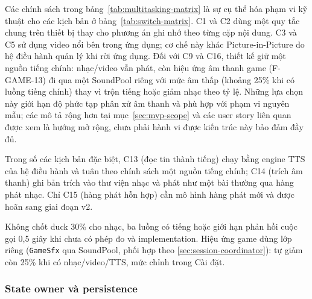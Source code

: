 Các chính sách trong bảng~\ref{tab:multitasking-matrix} là sự cụ thể hóa phạm vi kỹ thuật cho các kịch bản ở bảng~\ref{tab:switch-matrix}. C1 và C2 dùng một quy tắc chung trên thiết bị thay cho phương án ghi nhớ theo từng cặp nội dung. C3 và C5 sử dụng video nổi bên trong ứng dụng; cơ chế này khác Picture-in-Picture do hệ điều hành quản lý khi rời ứng dụng. Đối với C9 và C16, thiết kế giữ một nguồn tiếng chính: nhạc/video vẫn phát, còn hiệu ứng âm thanh game (F-GAME-13) đi qua một SoundPool riêng với mức âm thấp (khoảng 25\% khi có luồng tiếng chính) thay vì trộn tiếng hoặc giảm nhạc theo tỷ lệ. Những lựa chọn này giới hạn độ phức tạp phân xử âm thanh và phù hợp với phạm vi nguyên mẫu; các mô tả rộng hơn tại mục~\ref{sec:mvp-scope} và các user story liên quan được xem là hướng mở rộng, chưa phải hành vi được kiến trúc này bảo đảm đầy đủ.

Trong số các kịch bản đặc biệt, C13 (đọc tin thành tiếng) chạy bằng engine TTS của hệ điều hành và tuân theo chính sách một nguồn tiếng chính; C14 (trích âm thanh) ghi bản trích vào thư viện nhạc và phát như một bài thường qua hàng phát nhạc. Chỉ C15 (hàng phát hỗn hợp) cần mô hình hàng phát mới và được hoãn sang giai đoạn v2.

Không chốt duck 30\% cho nhạc, ba luồng có tiếng hoặc giới hạn phản hồi cuộc gọi 0,5 giây khi chưa có phép đo và implementation. Hiệu ứng game dùng lớp riêng (\texttt{GameSfx} qua SoundPool, phối hợp theo \ref{sec:session-coordinator}): tự giảm còn 25\% khi có nhạc/video/TTS, mức chỉnh trong Cài đặt.

\subsubsection{State owner và persistence}
\label{sec:state-storage}

